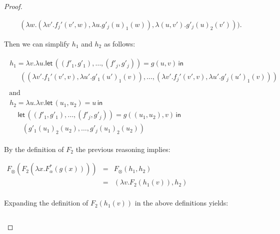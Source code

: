 \begin{proof}
\begin{report}
\begin{center}
\begin{itemize}
\begin{center}
\begin{math}
\begin{array}{lll}
      \,\,\,\,\,\,\,\,\,\,\,(\lambda w.(\lambda v'.f_j'(v',w),\lambda u.g'_j(u)_1(w)),\lambda (u,v').g'_j(u)_2(v'))).
          \end{array}
        \end{math}
      \end{center}
      Then we can simplify $h_1$ and $h_2$ as follows:
      \begin{center}
        \begin{math}
          \begin{array}{lll}
            \begin{array}{lll}
              h_1 = \lambda v.\lambda u.\mathsf{let}\,((f'_1,g'_1),\ldots,(f'_j,g'_j)) = g(u,v)\,\mathsf{in}\,\\
              \,\,\,\,\,\,\,\,\,((\lambda v'.f_1'(v',v),\lambda u'.g'_1(u')_1(v)),\ldots,(\lambda v'.f_j'(v',v),\lambda u'.g'_j(u')_1(v))) \\
            \end{array}\\
            \text{ and }\\
            \begin{array}{lll}
              h_2 = \lambda u.\lambda v.\mathsf{let}\,(u_1,u_2) = u\,\mathsf{in}\, \\
              \,\,\,\,\,\,\,\mathsf{let}\,((f'_1,g'_1),\ldots,(f'_j,g'_j)) = g((u_1,u_2),v) \,\mathsf{in}\,\\
              \,\,\,\,\,\,\,\,\,\,\,(g'_1(u_1)_2(u_2),\ldots,g'_j(u_1)_2(u_2))
            \end{array}
          \end{array}
        \end{math}
      \end{center}
      By the definition of $F_2$ the previous reasoning implies:
      \begin{center}
        \begin{math}
          \begin{array}{lll}
            F_\otimes(F_2(\lambda x.F^*_\alpha(g(x))))
            & = & F_\otimes(h_1,h_2)\\
            & = & (\lambda v.F_2(h_1(v)),h_2)\\
          \end{array}
        \end{math}
      \end{center}
      Expanding the definition of $F_2(h_1(v))$ in the above definitions yields:
      \begin{center}
        \begin{math}

\end{math}
\end{center}
\end{itemize}
\end{center}
\end{report}
\end{proof}
